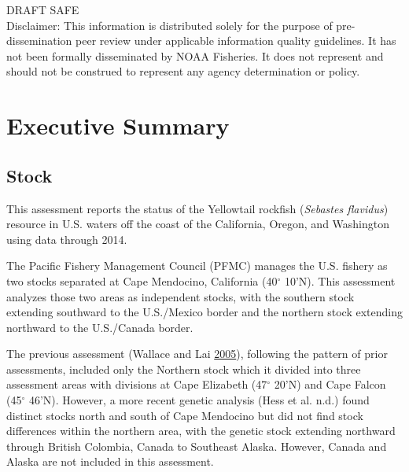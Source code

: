 \documentclass[12pt,]{article}
\begin{document}
\begin{center}
\vfill
DRAFT SAFE\\
Disclaimer: This information is distributed solely for the purpose of pre-dissemination
peer review under applicable information quality guidelines. It has not been formally
disseminated by NOAA Fisheries. It does not represent and should not be construed to
represent any agency determination or policy. 

\vspace{.3cm}

\maketitle

\setcounter{page}{1}
\end{center}

{
\setcounter{tocdepth}{4}
\tableofcontents
}
\setlength{\parskip}{5mm plus1mm minus1mm} \pagebreak

 \setcounter{page}{1}
\renewcommand{\thefigure}{\alph{figure}}
\renewcommand{\thetable}{\alph{table}}

\section*{Executive Summary}\label{executive-summary}

\subsection*{Stock}\label{stock}

This assessment reports the status of the Yellowtail rockfish
(\emph{Sebastes flavidus}) resource in U.S. waters off the coast of the
California, Oregon, and Washington using data through 2014.

The Pacific Fishery Management Council (PFMC) manages the U.S. fishery
as two stocks separated at Cape Mendocino, California (40\(^\circ\)
10'N). This assessment analyzes those two areas as independent stocks,
with the southern stock extending southward to the U.S./Mexico border
and the northern stock extending northward to the U.S./Canada border.

The previous assessment (Wallace and Lai
\protect\hyperlink{ref-Wallace2005}{2005}), following the pattern of
prior assessments, included only the Northern stock which it divided
into three assessment areas with divisions at Cape Elizabeth
(47\(^\circ\) 20'N) and Cape Falcon (45\(^\circ\) 46'N). However, a more
recent genetic analysis (Hess et al. n.d.) found distinct stocks north
and south of Cape Mendocino but did not find stock differences within
the northern area, with the genetic stock extending northward through
British Colombia, Canada to Southeast Alaska. However, Canada and Alaska
are not included in this assessment.
\end{document}
